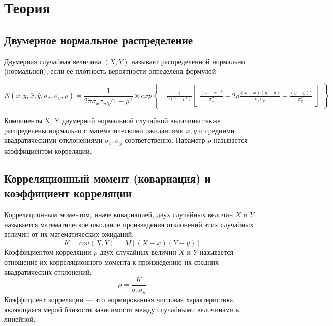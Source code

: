 \section{Теория}

\subsection{Двумерное нормальное распределение}
 
Двумерная случайная величина $(X,Y)$ называет распределенной нормально (нормальной), если ее плотность вероятности определена формулой 

\begin{equation}
	N(x, y, \bar{x}, \bar{y}, \sigma_{x}, \sigma_{y}, \rho) = 
	\frac{1}{2\pi\sigma_{x}\sigma_{y}\sqrt{1-\rho^{2}}} \times
	exp{\begin{Bmatrix}
			-\frac{1}{2(1-\rho^{2})}
			\begin{bmatrix}
				\frac{(x-\bar{x})^{2}}{\sigma_{x}^{2}} - 2\rho\frac{(x-\bar{x})(y-\bar{y})}{\sigma_{x}\sigma_{y}} + \frac{(y-\bar{y})^{2}}{\sigma_{y}^{2}}
			\end{bmatrix}
	\end{Bmatrix}}
\end{equation}

Компоненты X, Y двумерной нормальной случайной величины также распределены нормально с математическими ожиданиями $\overline x, \overline y$ и средними квадратическими отклонениями $\sigma_{x}, \sigma_{y}$ соответственно. Параметр $\rho$ называется коэффициентом корреляции. 

\subsection{Корреляционный момент (ковариация) и коэффициент корреляции}
\noindent Корреляционным моментом, иначе ковариацией, двух случайных величин $X$ и $Y$ называется математическое ожидание произведения отклонений этих случайных величин от их математических ожиданий.
\begin{equation}
	K = cov(X, Y) = M[(X - \bar{x})(Y - \bar{y})]
	\label{K}
\end{equation}
Коэффициентом корреляции $\rho$ двух случайных величин $X$ и $Y$ называется отношение их корреляционного момента к произведению их средних квадратических отклонений:
\begin{equation}
	\rho = \frac{K}{\sigma_{x}\sigma_{y}}
	\label{ro}
\end{equation}
Коэффициент корреляции — это нормированная числовая характеристика, являющаяся мерой близости зависимости между случайными величинами к линейной.

